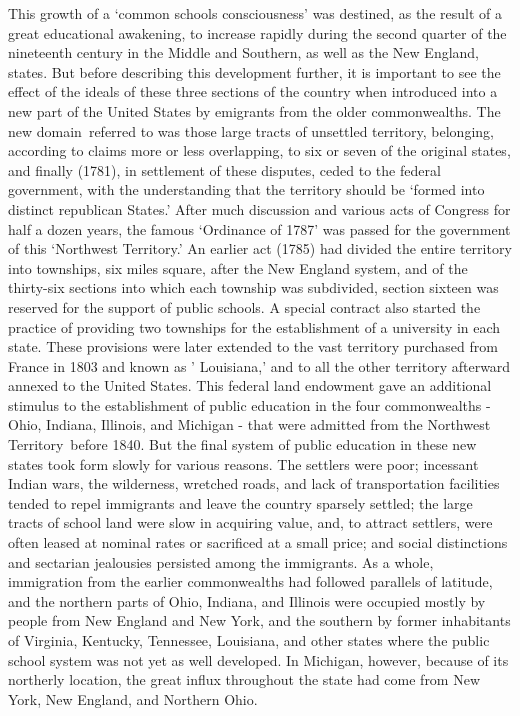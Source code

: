 \documentclass[]{book}
\begin{document}
This growth of a `common schools consciousness' was destined, as the result of a great educational awakening, to increase rapidly during the second quarter of the nineteenth century in the Middle and Southern, as well as the New England, states. But before describing this development further, it is important to see the effect of the ideals of these three sections of the country when introduced into a new part of the United States by emigrants from the older commonwealths. The new domain~referred to was those large tracts of unsettled territory, belonging, according to claims more or less overlapping, to six or seven of the original states, and finally (1781), in settlement of these disputes, ceded to the federal government, with the understanding that the territory should be `formed into distinct republican States.' After much discussion and various acts of Congress for half a dozen years, the famous `Ordinance of 1787' was passed for the government of this `Northwest Territory.' An earlier act (1785) had divided the entire territory into townships, six miles square, after the New England system, and of the thirty-six sections into which each township was subdivided, section sixteen was reserved for the support of public schools. A special contract also started the practice of providing two townships for the establishment of a university in each state. These provisions were later extended to the vast territory purchased from France in 1803 and known as ' Louisiana,' and to all the other territory afterward annexed to the United States. This federal land endowment gave an additional stimulus to the establishment of public education in the four commonwealths - Ohio, Indiana, Illinois, and Michigan - that were admitted from the Northwest Territory~before 1840. But the final system of public education in these new states took form slowly for various reasons. The settlers were poor; incessant Indian wars, the wilderness, wretched roads, and lack of transportation facilities tended to repel immigrants and leave the country sparsely settled; the large tracts of school land were slow in acquiring value, and, to attract settlers, were often leased at nominal rates or sacrificed at a small price; and social distinctions and sectarian jealousies persisted among the immigrants. As a whole, immigration from the earlier commonwealths had followed parallels of latitude, and the northern parts of Ohio, Indiana, and Illinois were occupied mostly by people from New England and New York, and the southern by former inhabitants of Virginia, Kentucky, Tennessee, Louisiana, and other states where the public school system was not yet as well developed. In Michigan, however, because of its northerly location, the great influx throughout the state had come from New York, New England, and Northern Ohio.
\end{document}

